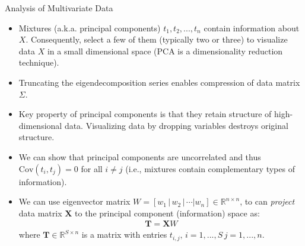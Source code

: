\documentclass[9pt]{beamer}
\begin{document}
\begin{frame}{Analysis of Multivariate Data}

\begin{itemize}
\item Mixtures (a.k.a. principal components) $t_1,t_2,...,t_n$ contain information about $X$. Consequently, select a few of them (typically two or three) to visualize data $X$ in a small dimensional space (PCA is a dimensionality reduction technique). 

\item Truncating the eigendecomposition series enables compression of data matrix $\Sigma$. 

\item Key property of principal components is that they retain structure of high-dimensional data. Visualizing data by dropping variables destroys original structure.

\item We can show that principal components are uncorrelated and thus $\textrm{Cov}(t_i,t_j)=0$ for all $i\neq j$ (i.e., mixtures contain complementary types of information). 

\item We can use eigenvector matrix $W=[w_1\,|\,w_2\,|\,\cdots|w_n]\in \mathbb{R}^{n\times n}$, to can {\em project} data matrix $\mathbf{X}$ to the principal component (information) space as: 
\begin{align*}
\mathbf{T}=\mathbf{X}W
\end{align*}
where $\mathbf{T}\in \mathbb{R}^{S\times n}$ is a matrix with entries $t_{i,j},\,i=1,...,S\, j=1,...,n$. 

 
\end{itemize}


\end{frame}
\end{document}
